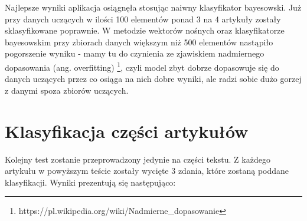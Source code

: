 Najlepsze wyniki aplikacja osiągnęła stosując naiwny klasyfikator bayesowski. Już przy danych uczących w ilości 100 elementów ponad 3 na 4 artykuły zostały sklasyfikowane poprawnie.
W metodzie wektorów nośnych oraz klasyfikatorze bayesowskim przy zbiorach danych większym niż 500 elementów nastąpiło pogorszenie wyniku - mamy tu do czynienia ze zjawiskiem nadmiernego dopasowania (ang. overfitting) \footnote{https://pl.wikipedia.org/wiki/Nadmierne_dopasowanie}, czyli model zbyt dobrze dopasowuje się do danych uczących przez co osiąga na nich dobre wyniki, ale radzi sobie dużo gorzej z danymi spoza zbiorów uczących.

\section{Klasyfikacja części artykułów}

Kolejny test zostanie przeprowadzony jedynie na części tekstu. Z każdego artykułu w powyższym teście zostały wycięte 3 zdania, które zostaną poddane klasyfikacji. Wyniki prezentują się następująco:

